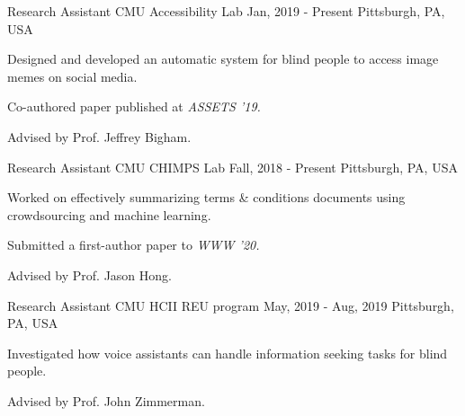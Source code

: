 

\begin{cventries}

  \cventry
    {Research Assistant} %
    {CMU Accessibility Lab} %
    {Jan, 2019 - Present} %
    {Pittsburgh, PA, USA} %
    {
      \begin{cvitems} %
        \item {Designed and developed an automatic system for blind people to access image memes on social media.}
        \item {Co-authored paper published at \it{ASSETS '19}.}
        \item {Advised by Prof. Jeffrey Bigham.}
      \end{cvitems}
    }

  \cventry
    {Research Assistant} %
    {CMU CHIMPS Lab} %
    {Fall, 2018 - Present} %
    {Pittsburgh, PA, USA} %
    {
      \begin{cvitems} %
        \item {Worked on effectively summarizing terms \& conditions documents using crowdsourcing and machine learning.}
        \item {Submitted a first-author paper to \it{WWW '20}.}
        \item {Advised by Prof. Jason Hong.}
      \end{cvitems}
    }

  \cventry
    {Research Assistant} %
    {CMU HCII REU program} %
    {May, 2019 - Aug, 2019} %
    {Pittsburgh, PA, USA} %
    {
      \begin{cvitems} %
        \item {Investigated how voice assistants can handle information seeking tasks for blind people.}
        \item {Advised by Prof. John Zimmerman.}
      \end{cvitems}
    }


\end{cventries}
